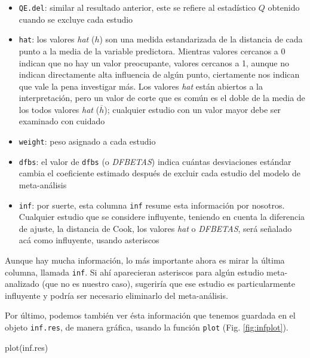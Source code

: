 \documentclass[
  bookmarksnumbered]{article}
\newenvironment{Shaded}{\begin{snugshade}}{\end{snugshade}}
\newcommand{\FunctionTok}[1]{\textcolor[rgb]{0.39,0.29,0.61}{#1}}
\newcommand{\NormalTok}[1]{\textcolor[rgb]{0.12,0.11,0.11}{#1}}
\begin{document}
\begin{itemize}
\item
  \texttt{QE.del}: similar al resultado anterior, este se refiere al estadístico \(Q\) obtenido cuando se excluye cada estudio
\item
  \texttt{hat}: los valores \emph{hat} (\(h\)) son una medida estandarizada de la distancia de cada punto a la media de la variable predictora. Mientras valores cercanos a 0 indican que no hay un valor preocupante, valores cercanos a 1, aunque no indican directamente alta influencia de algún punto, ciertamente nos indican que vale la pena investigar más. Los valores \emph{hat} están abiertos a la interpretación, pero un valor de corte que es común es el doble de la media de los todos valores \emph{hat} (\(\overline{h}\)); cualquier estudio con un valor mayor debe ser examinado con cuidado
\item
  \texttt{weight}: peso asignado a cada estudio
\item
  \texttt{dfbs}: el valor de \texttt{dfbs} (o \emph{DFBETAS}) indica cuántas desviaciones estándar cambia el coeficiente estimado después de excluir cada estudio del modelo de meta-análisis
\item
  \texttt{inf}: por suerte, esta columna \texttt{inf} resume esta información por nosotros. Cualquier estudio que se considere influyente, teniendo en cuenta la diferencia de ajuste, la distancia de Cook, los valores \emph{hat} o \emph{DFBETAS}, será señalado acá como influyente, usando asteriscos
\end{itemize}

Aunque hay mucha información, lo más importante ahora es mirar la última columna, llamada \texttt{inf}. Si ahí aparecieran asteriscos para algún estudio meta-analizado (que no es nuestro caso), sugeriría que ese estudio es particularmente influyente y podría ser necesario eliminarlo del meta-análisis.

Por último, podemos también ver ésta información que tenemos guardada en el objeto \texttt{inf.res}, de manera gráfica, usando la función \texttt{plot} (Fig. \ref{fig:infplot}).

\begin{Shaded}
\begin{Highlighting}[]
\FunctionTok{plot}\NormalTok{(inf.res)}
\end{Highlighting}
\end{Shaded}
\end{document}
